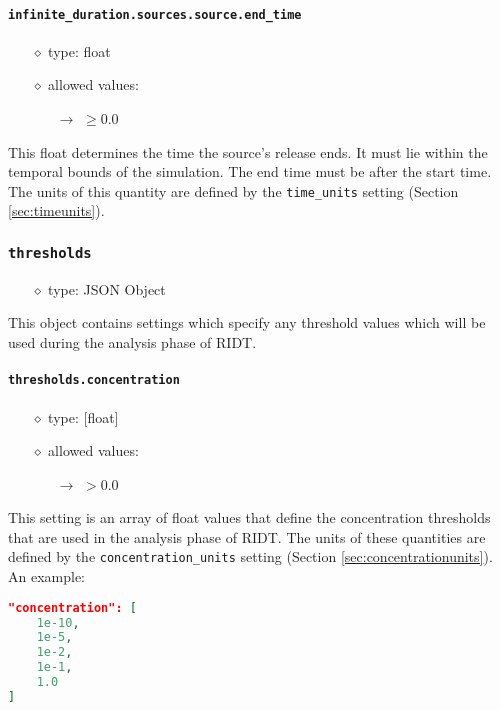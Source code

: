 \documentclass[]{article}
\def\code#1{\texttt{#1}}
\begin{document}
\paragraph{\code{infinite\_duration.sources.source.end\_time}}\label{sec:infsourceendtime}
\begin{itemize}
    \item[$\diamond$] type: float 
    \item[$\diamond$] allowed values:
    \begin{itemize}
        \item[$\rightarrow$] $\geq0.0$
    \end{itemize}
\end{itemize}
This float determines the time the source's release ends. It must lie within
the temporal bounds of the simulation. The end time must be after the start 
time. The units of this quantity are defined by the \code{time\_units} setting
(Section \ref{sec:timeunits}).

\subsubsection{\code{thresholds}}

\begin{itemize}
    \item[$\diamond$] type: JSON Object 
\end{itemize}
This object contains settings which specify any threshold values which will be
used during the analysis phase of RIDT. 

\paragraph{\code{thresholds.concentration}}\label{sec:concentrationthresholds}
\begin{itemize}
    \item[$\diamond$] type: [float] 
    \item[$\diamond$] allowed values:
    \begin{itemize}
        \item[$\rightarrow$] $>0.0$
    \end{itemize}
\end{itemize}
This setting is an array of float values that define the concentration
thresholds that are used in the analysis phase of RIDT. The units of these
quantities are defined by the \code{concentration\_units} setting (Section
\ref{sec:concentrationunits}). An example:\\
\begin{lstlisting}[language=json,firstnumber=1]
"concentration": [
    1e-10,
    1e-5,
    1e-2,
    1e-1,
    1.0
]
\end{lstlisting}
\end{document}
